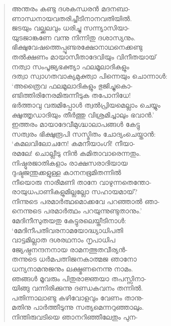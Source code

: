 \begin{verse}
അന്തരം കണ്ടു ദശകന്ധരന്‍ മദനബാ-\\
ണാന്ധനായവതരിച്ചീടിനാനവതിയില്‍.\\
ജടയും വല്ക്കലവും ധരിച്ചു സന്ന്യാസിയാ-\\
യുടജാങ്കണേ വന്നു നിന്നിതു ദശാസ്യനും.\\
ഭിക്ഷുവേഷത്തെപ്പൂണ്ടരക്ഷോനാഥനെക്കണ്ടു\\
തല്‍ക്ഷണം മായാസീതാദേവിയും വിനീതയായ്\\
നത്വാ സംപൂജ്യഭക്ത്യാ ഫലമൂലാദികളും\\
ദത്വാ സ്വാഗതവാക്യമുക്ത്വാ പിന്നെയും ചൊന്നാള്‍:\\
‘അത്രൈവ ഫലമൂലാദികളും ഭുജിച്ചുകൊ-\\
ണ്ടിത്തിരിനേരമിരുന്നീടുക തപോനിധേ!\\
ഭര്‍ത്താവു വരുമിപ്പോള്‍ ത്വല്‍പ്രിയമെല്ലാം ചെയ്യും\\
ക്ഷുത്തൃഡാദിയും തീര്‍ത്തു വിശ്രമിച്ചാലും ഭവാന്‍.’\\
ഇത്തരം മായാദേവീമുഗ്ദ്ധാലാപങ്ങള്‍ കേട്ടു\\
സത്വരം ഭിക്ഷുരൂപി സസ്മിതം ചോദ്യംചെയ്താന്‍:\\
‘കമലവിലോചനേ! കമനീയാംഗി! നീയാ-\\
രമലേ! ചൊല്ലീടു നിന്‍ കമിതാവാരെന്നതും.\\
നിഷ്ഠുരജാതികളാം രാക്ഷസരാദിയായ\\
ദുഷ്ടജന്തുക്കളുള്ള കാനനഭൂമിതന്നില്‍\\
നീയൊരു നാരീമണി താനേ വാഴുന്നതെന്തോ-\\
രായുധപാണികളുമില്ലല്ലോ സഹായമായ്?\\
നിന്നുടെ പരമാര്‍ത്ഥമൊക്കവേ പറഞ്ഞാല്‍ ഞാ-\\
നെന്നുടെ പരമാര്‍ത്ഥം പറയുന്നുണ്ടുതാനും.’\\
മേദിനീസുതയതു കേട്ടുരലെയ്തീടിനാള്‍:\\
‘മേദിനീപതിവരനാമയോദ്ധ്യാധിപതി\\
വാട്ടമില്ലാത ദശരഥനാം നൃപാധിപ\\
ജ്യേഷ്ഠനന്ദനനായ രാമനത്ഭുതവീര്യന്‍-\\
തന്നുടെ ധര്‍മപത്നിജനകാത്മജ ഞാനോ\\
ധന്യനാമനുജനും ലക്ഷ്മണനെന്നു നാമം.\\
ഞങ്ങള്‍ മൂവരും പിതുരാജ്ഞയാ തപസ്സിനാ-\\
യിങ്ങു വന്നിരിക്കുന്നു ദണ്ഡകവനം തന്നില്‍.\\
പതിന്നാലാണ്ടു കഴിവോളവും വേണം താനു-\\
മതിനു പാര്‍ത്തീടുന്നു സത്യമെന്നറുഞ്ഞാലും.\\
നിന്തിരുവടിയെ ഞാനറിഞ്ഞീലേതും പുന-\\

\end{verse}
